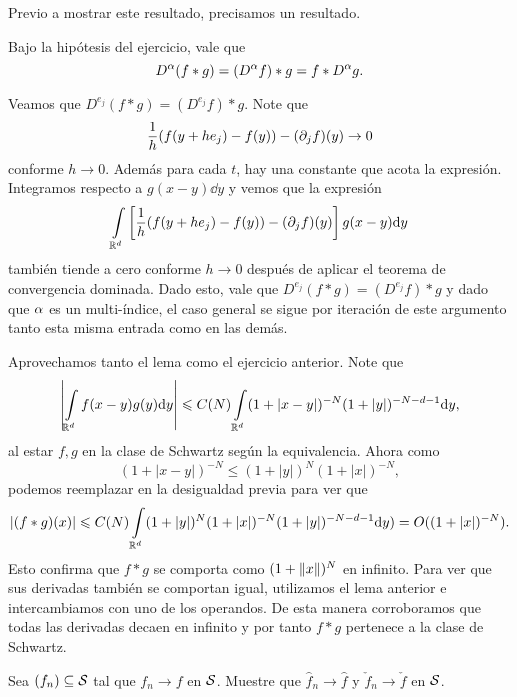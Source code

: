 \documentclass[12pt]{memoir}
\begin{document}
Previo a mostrar este resultado, precisamos un resultado.

\begin{Lem}
  Bajo la hipótesis del ejercicio, vale que
  $$D^\alpha(f\ast g)=(D^\alpha f)\ast g=f\ast D^\alpha g.$$
\end{Lem}

\begin{ptcbp}
  Veamos que $D^{e_j}(f\ast g)=(D^{e_j}f)\ast g$. Note que 
  $$\frac{1}{h}(f(y+he_j)-f(y))-(\partial_jf)(y)\to 0$$
  conforme $h\to 0$. Además para cada $t$, hay una constante que acota la expresión. Integramos respecto a $g(x-y)\dd y$ y vemos que la expresión
  $$\int\limits_{\mathbb{R}^d}\left\lbrack\frac{1}{h}(f(y+he_j)-f(y))-(\partial_jf)(y)\right\rbrack g(x-y)\dd y$$
  también tiende a cero conforme $h\to 0$ después de aplicar el teorema de convergencia dominada. Dado esto, vale que $D^{e_j}(f\ast g)=(D^{e_j}f)\ast g$ y dado que $\alpha$ es un multi-índice, el caso general se sigue por iteración de este argumento tanto esta misma entrada como en las demás.
\end{ptcbp}

\begin{ptcbp}%
  Aprovechamos tanto el lema como el ejercicio anterior. Note que 
  $$\left|\int\limits_{\mathbb{R}^d}f(x-y)g(y)\dd y\right|\leqslant C(N)\int\limits_{\mathbb{R}^d}(1+|x-y|)^{-N}(1+|y|)^{-N-d-1}\dd y,$$
  al estar $f,g$ en la clase de Schwartz según la equivalencia. Ahora como 
  $$(1+|x-y|)^{-N}\leq (1+|y|)^N(1+|x|)^{-N},$$
  podemos reemplazar en la desigualdad previa para ver que
  $$|(f\ast g)(x)|\leqslant C(N)\int\limits_{\mathbb{R}^d}(1+|y|)^N(1+|x|)^{-N}(1+|y|)^{-N-d-1}\dd y)=O((1+|x|)^{-N}).$$
  Esto confirma que $f\ast g$ se comporta como $(1+\left\|x\right\|)^N$ en infinito. Para ver que sus derivadas también se comportan igual, utilizamos el lema anterior e intercambiamos con uno de los operandos. De esta manera corroboramos que todas las derivadas decaen en infinito y por tanto $f\ast g$ pertenece a la clase de Schwartz.
\end{ptcbp}

\begin{Ej}
  Sea $(f_n)\subseteq\mathcal{S}$ tal que $f_n\to f$ en $\mathcal{S}$. Muestre que $\hat{f}_n\to \hat{f}$ y $\check{f}_n\to\check{f}$ en $\mathcal{S}$.
\end{Ej}
\end{document}
